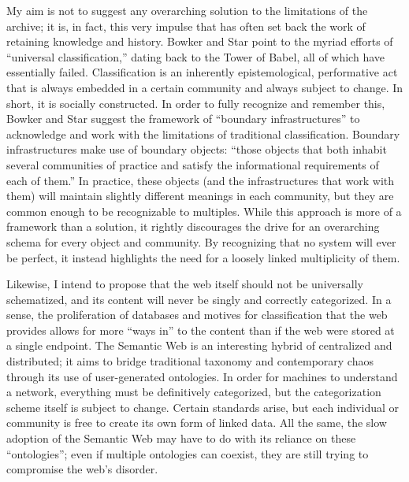 My aim is not to suggest any overarching solution to the limitations of the archive; it is, in fact, this very impulse that has often set back the work of retaining knowledge and history. Bowker and Star point to the myriad efforts of ``universal classification,'' dating back to the Tower of Babel, all of which have essentially failed. Classification is an inherently epistemological, performative act that is always embedded in a certain community and always subject to change. In short, it is socially constructed. In order to fully recognize and remember this, Bowker and Star suggest the framework of ``boundary infrastructures'' to acknowledge and work with the limitations of traditional classification. Boundary infrastructures make use of boundary objects: ``those objects that both inhabit several communities of practice and satisfy the informational requirements of each of them.''  In practice, these objects (and the infrastructures that work with them) will maintain slightly different meanings in each community, but they are common enough to be recognizable to multiples. While this approach is more of a framework than a solution, it rightly discourages the drive for an overarching schema for every object and community. By recognizing that no system will ever be perfect, it instead highlights the need for a loosely linked multiplicity of them.

Likewise, I intend to propose that the web itself should not be universally schematized, and its content will never be singly and correctly categorized. In a sense, the proliferation of databases and motives for classification that the web provides allows for more ``ways in'' to the content than if the web were stored at a single endpoint. The Semantic Web is an interesting hybrid of centralized and distributed; it aims to bridge traditional taxonomy and contemporary chaos through its use of user-generated ontologies. In order for machines to understand a network, everything must be definitively categorized, but the categorization scheme itself is subject to change. Certain standards arise, but each individual or community is free to create its own form of linked data. All the same, the slow adoption of the Semantic Web may have to do with its reliance on these ``ontologies''; even if multiple ontologies can coexist, they are still trying to compromise the web's disorder.

